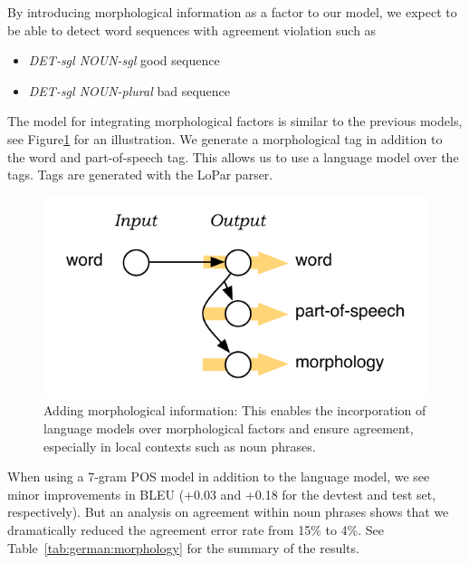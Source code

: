 \documentclass[11pt]{report}
\theoremstyle{plain}
\begin{document}
{By introducing morphological information as a factor to our model, we expect to be able to detect word sequences with agreement violation such as
\begin{itemize}
\item {\em DET-sgl NOUN-sgl} good sequence
\item {\em DET-sgl NOUN-plural} bad sequence
\end{itemize}

The model for integrating morphological factors is similar to the previous models, see Figure\ref{fig:german:morphology} for an illustration. We generate a morphological tag in addition to the word and part-of-speech tag. This allows us to use a language model over the tags. Tags are generated with the LoPar parser.

\begin{figure}
\begin{center}
\includegraphics[scale=1]{factored-posmorph-lm.pdf}
\end{center} 
\caption{Adding morphological information: This enables the incorporation of language models over morphological factors and ensure agreement, especially in local contexts such as noun phrases.}
\label{fig:german:morphology}
\end{figure}

When using a 7-gram POS model in addition to the language model, we see minor improvements in BLEU (+0.03 and +0.18 for the devtest and test set, respectively). But an analysis on agreement within noun phrases shows that we dramatically reduced the agreement error rate from 15\% to 4\%. See Table~\ref{tab:german:morphology} for the summary of the results.

}
\end{document}
